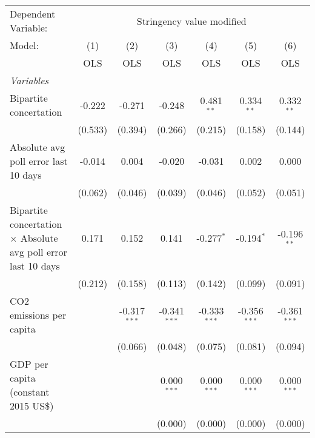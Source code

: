 
\begingroup
\centering
\begin{tabular}{lcccccc}
   \toprule
   Dependent Variable: & \multicolumn{6}{c}{Stringency value modified}\\
   Model:                                                                & (1)     & (2)            & (3)            & (4)            & (5)            & (6)\\  
                                                                         &  OLS    & OLS            & OLS            & OLS            & OLS            & OLS\\  
   \midrule
   \emph{Variables}\\
   Bipartite concertation                                                & -0.222  & -0.271         & -0.248         & 0.481$^{**}$   & 0.334$^{**}$   & 0.332$^{**}$\\   
                                                                         & (0.533) & (0.394)        & (0.266)        & (0.215)        & (0.158)        & (0.144)\\   
   Absolute avg poll error last 10 days                                  & -0.014  & 0.004          & -0.020         & -0.031         & 0.002          & 0.000\\   
                                                                         & (0.062) & (0.046)        & (0.039)        & (0.046)        & (0.052)        & (0.051)\\   
   Bipartite concertation $\times$ Absolute avg poll error last 10 days  & 0.171   & 0.152          & 0.141          & -0.277$^{*}$   & -0.194$^{*}$   & -0.196$^{**}$\\   
                                                                         & (0.212) & (0.158)        & (0.113)        & (0.142)        & (0.099)        & (0.091)\\   
   CO2 emissions per capita                                              &         & -0.317$^{***}$ & -0.341$^{***}$ & -0.333$^{***}$ & -0.356$^{***}$ & -0.361$^{***}$\\   
                                                                         &         & (0.066)        & (0.048)        & (0.075)        & (0.081)        & (0.094)\\   
   GDP per capita (constant 2015 US\$)                                   &         &                & 0.000$^{***}$  & 0.000$^{***}$  & 0.000$^{***}$  & 0.000$^{***}$\\   
                                                                         &         &                & (0.000)        & (0.000)        & (0.000)        & (0.000)\\   

\end{tabular}
